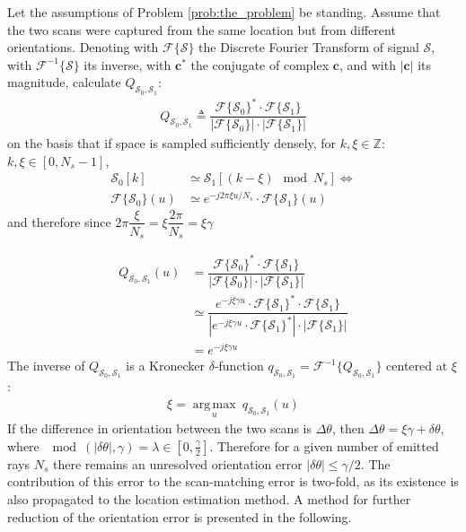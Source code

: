 Let the assumptions of Problem \ref{prob:the_problem} be standing. Assume that
the two scans were captured from the same location but from different
orientations. Denoting with $\mathcal{F}\{\mathcal{S}\}$ the Discrete Fourier
Transform of signal $\mathcal{S}$, with $\mathcal{F}^{-1}\{\mathcal{S}\}$
its inverse, with $\bm{c}^\ast$ the conjugate of complex $\bm{c}$, and with
$|\bm{c}|$ its magnitude, calculate
$Q_{\mathcal{S}_0, \mathcal{S}_1}$:
\begin{align}
  Q_{\mathcal{S}_0, \mathcal{S}_1} \triangleq \dfrac{\mathcal{F}\{\mathcal{S}_0\}^{\ast} \cdot \mathcal{F}\{\mathcal{S}_1\}}{|\mathcal{F}\{\mathcal{S}_0\}| \cdot |\mathcal{F}\{\mathcal{S}_1\}|}
\end{align}
on the basis that if space is sampled sufficiently densely, for
$k,\xi \in \mathbb{Z}$: $k,\xi \in [0, N_s-1]$,
\begin{align}
  \mathcal{S}_0[k] &\simeq \mathcal{S}_1[(k - \xi) \mod N_s] \Leftrightarrow \nonumber \\
  \mathcal{F}\{\mathcal{S}_0\}(u) &\simeq e^{-j 2\pi \xi u / N_s} \cdot \mathcal{F}\{\mathcal{S}_1\}(u) \nonumber
\end{align}
and therefore since $2\pi \dfrac{\xi}{N_s} = \xi \dfrac{2\pi}{N_s} = \xi \gamma$

\begin{align}
  Q_{\mathcal{S}_0, \mathcal{S}_1}(u) &= \dfrac{\mathcal{F}\{\mathcal{S}_0\}^{\ast} \cdot \mathcal{F}\{\mathcal{S}_1\}}{|\mathcal{F}\{\mathcal{S}_0\}| \cdot |\mathcal{F}\{\mathcal{S}_1\}|}  \nonumber \\
  &\simeq \dfrac{e^{-j \xi \gamma  u} \cdot \mathcal{F}\{\mathcal{S}_1\}^\ast \cdot \mathcal{F}\{\mathcal{S}_1\}}{|e^{-j \xi \gamma u} \cdot \mathcal{F}\{\mathcal{S}_1\}^\ast | \cdot | \mathcal{F}\{\mathcal{S}_1\}|} \nonumber \\
  &= e^{-j \xi \gamma u}
  \label{eq:Q0}
\end{align}
The inverse of $Q_{\mathcal{S}_0, \mathcal{S}_1}$ is a Kronecker
$\delta$-function
$q_{\mathcal{S}_0, \mathcal{S}_1} = \mathcal{F}^{-1}\{Q_{\mathcal{S}_0, \mathcal{S}_1}\}$
centered at $\xi$:
\begin{align}
  \xi = \operatorname*{arg\,max}\limits_u \ q_{\mathcal{S}_0, \mathcal{S}_1}(u)
\end{align}
If the difference in orientation between the two scans is $\Delta\theta$, then
$\Delta\theta = \xi\gamma + \delta\theta$, where
$\mod(|\delta\theta|, \gamma) = \lambda \in [0,\frac{\gamma}{2}]$. Therefore for
a given number of emitted rays $N_s$ there remains an unresolved orientation
error $|\delta\theta| \leq \gamma/2$. The contribution of this error to the
scan-matching error is two-fold, as its existence is also propagated to the
location estimation method. A method for further reduction of
the orientation error is presented in the following.


